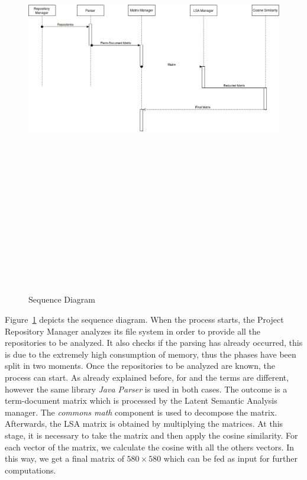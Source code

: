 \begin{figure}[!h]
	\includegraphics[width=15cm,height=20cm,keepaspectratio]{images/SequenceDiagram.png}
	\caption{Sequence Diagram}
	\label{fig:Sequence}
\end{figure}

Figure~\ref{fig:Sequence} depicts the sequence diagram. When the process starts, the Project Repository Manager analyzes its file system in order to provide all the repositories to be analyzed. It also checks if the parsing has already occurred, this is due to the extremely high consumption of memory, thus the phases have been split in two moments. Once the repositories to be analyzed are known, the process can start. As already explained before, for \MUDABlue and \CLAN the terms are different, however the same library  \emph{Java Parser} is used in both cases. The outcome is a term-document matrix which is processed by the Latent Semantic Analysis manager. The \emph{commons math} component is used to decompose the matrix. Afterwards, the LSA matrix is obtained by multiplying the matrices. At this stage, it is necessary to take the matrix and then apply the cosine similarity. For each vector of the matrix, we calculate the cosine with all the others vectors. In this way, we get a final matrix of $580 \times 580$ which can be fed as input for further computations.

